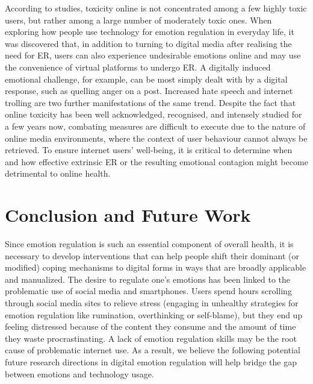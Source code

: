 \documentclass[lettersize,journal]{IEEEtran}
\begin{document}
According to studies, toxicity online is not concentrated among a few highly toxic users, but rather among a large number of moderately toxic ones. When exploring how people use technology for emotion regulation in everyday life, it was discovered that, in addition to turning to digital media after realising the need for ER, users can also experience undesirable emotions online and may use the convenience of virtual platforms to undergo ER. A digitally induced emotional challenge, for example, can be most simply dealt with by a digital response, such as quelling anger on a post. Increased hate speech and internet trolling are two further manifestations of the same trend. Despite the fact that online toxicity has been well acknowledged, recognised, and intensely studied for a few years now, combating measures are difficult to execute due to the nature of online media environments, where the context of user behaviour cannot always be retrieved. To ensure internet users' well-being, it is critical to determine when and how effective extrinsic ER or the resulting emotional contagion might become detrimental to online health.





 




\section{Conclusion and Future Work}
Since emotion regulation is such an essential component of overall health, it is necessary to develop interventions that can help people shift their dominant (or modified) coping mechanisms to digital forms in ways that are broadly applicable and manualized. The desire to regulate one's emotions has been linked to the problematic use of social media and smartphones. Users spend hours scrolling through social media sites to relieve stress (engaging in unhealthy strategies for emotion regulation like rumination, overthinking or self-blame), but they end up feeling distressed because of the content they consume and the amount of time they waste procrastinating. A lack of emotion regulation skills may be the root cause of problematic internet use. As a result, we believe the following potential future research directions in digital emotion regulation will help bridge the gap between emotions and technology usage.
\end{document}
